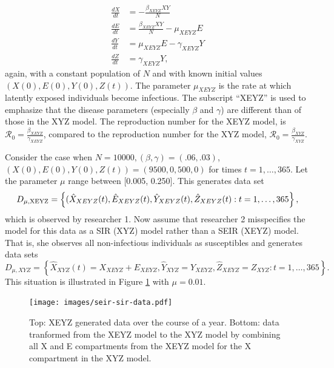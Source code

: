 \documentclass[12pt]{article}
\newcommand{\rr}{\ensuremath{\mathcal{R}_0}}
\begin{document}
\begin{align*}
  \frac{dX}{dt} &= - \frac{\beta_{XEYZ} XY}{N} \\
  \frac{dE}{dt} &= \frac{\beta_{XEYZ} XY}{N}  - \mu_{XEYZ} E\\
  \frac{dY}{dt} &= \mu_{XEYZ} E - \gamma_{XEYZ} Y \\
  \frac{dZ}{dt} &= \gamma_{XEYZ} Y,
\end{align*}
again, with a constant population of $N$ and with known initial values $(X(0), E(0), Y(0), Z(t))$.  The parameter $\mu_{XEYZ}$ is the rate at which latently exposed individuals become infectious.  The subscript ``XEYZ'' is used to emphasize that the disease parameters (especially $\beta$ and $\gamma$) are different than of those in the XYZ model.  The reproduction number for the XEYZ model, is $\rr = \frac{\beta_{XEYZ}}{\gamma_{XEYZ}}$, compared to the reproduction number for the XYZ model, $\rr = \frac{\beta_{XYZ}}{\gamma_{XYZ}}$.

Consider the case when $N=10000, (\beta, \gamma) = (.06, .03)$, $(X(0), E(0), Y(0), Z(t)) = (9500, 0, 500, 0)$ for times $t=1, \dots, 365$.  Let the parameter $\mu$ range between [0.005, 0.250].  This generates data set
$$D_{\mu, \textnormal{XEYZ}} = \left \{(\hat{X}_{XEYZ}(t), \hat{E}_{XEYZ}(t), \hat{Y}_{XEYZ}(t), \hat{Z}_{XEYZ}(t): t=1, \dots, 365\right \},$$
which is observed by researcher 1.  Now assume that researcher 2 misspecifies the model for this data as a SIR (XYZ) model rather than a SEIR (XEYZ) model.  That is, she observes all non-infectious individuals as susceptibles and generates data sets
$$D_{\mu, XYZ} = \left \{\hat{X}_{XYZ}(t) = X_{XEYZ} + E_{XEYZ}, \hat{Y}_{XYZ} = Y_{XEYZ}, \hat{Z}_{XEYZ} = Z_{XYZ} : t = 1, \dots, 365 \right \}.$$
This situation is illustrated in Figure \ref{fig:sir-vs-seir} with $\mu = 0.01$.

\begin{figure}
  \centering
  \texttt{[image: images/seir-sir-data.pdf]}
  \caption{Top: XEYZ generated data over the course of a year.  Bottom: data tranformed from the XEYZ model to the XYZ model by combining all X and E compartments from the XEYZ model for the X compartment in the XYZ model.}\label{fig:sir-vs-seir}
  \end{figure}
\end{document}
